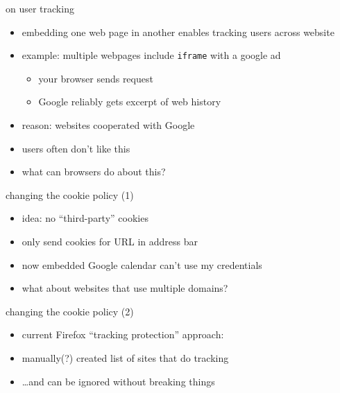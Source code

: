 \begin{frame}{on user tracking}
    \begin{itemize}
    \item embedding one web page in another enables tracking users across website
    \item example: multiple webpages include \texttt{iframe} with a google ad
        \begin{itemize}
        \item your browser sends request 
        \item Google reliably gets excerpt of web history
        \end{itemize}
    \item reason: websites cooperated with Google
    \item users often don't like this
    \item what can browsers do about this?
    \end{itemize}
\end{frame}

\begin{frame}{changing the cookie policy (1)}
    \begin{itemize}
    \item idea: no ``third-party'' cookies
    \item only send cookies for URL in address bar
    \vspace{.5cm}
    \item<2> now embedded Google calendar can't use my credentials
    \item<2> what about websites that use multiple domains?
    \end{itemize}
\end{frame}

\begin{frame}{changing the cookie policy (2)}
    \begin{itemize}
    \item current Firefox ``tracking protection'' approach:
    \item manually(?) created list of sites that do tracking
    \item \ldots and can be ignored without breaking things
    \end{itemize}
\end{frame}

